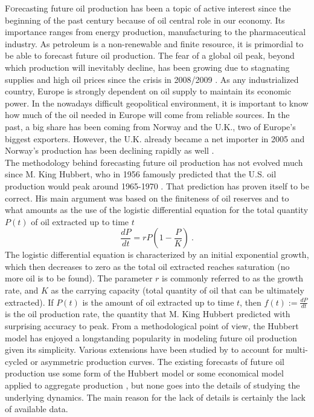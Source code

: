 \documentclass[review]{elsarticle}
\begin{document}
\lettrine[nindent=0em,lines=3] Forecasting future oil production
has been a topic of active interest since the beginning of the past
century because of oil central role in our economy. Its importance
ranges from energy production, manufacturing to the pharmaceutical
industry. As petroleum is a non-renewable and finite resource, it
is primordial to be able to forecast future oil production. The fear
of a global oil peak, beyond which production will inevitably decline,
has been growing due to stagnating supplies and high oil prices since
the crisis in 2008/2009 \citep{Murray2013}. As any industrialized
country, Europe is strongly dependent on oil supply to maintain its
economic power. In the nowadays difficult geopolitical environment,
it is important to know how much of the oil needed in Europe will
come from reliable sources. In the past, a big share has been coming
from Norway and the U.K., two of Europe's biggest exporters. However,
the U.K. already became a net importer in 2005 and Norway\textquoteright{}s
production has been declining rapidly as well \citep{Hook2008}.\\
 The methodology behind forecasting future oil production has not
evolved much since M. King Hubbert, who in 1956 famously predicted
that the U.S. oil production would peak around 1965-1970 \citep{Hubbert1956}.
That prediction has proven itself to be correct. His main argument
was based on the finiteness of oil reserves and to what amounts
as the use of the logistic differential equation for the total
quantity $P(t)$ of oil extracted up to time $t$
\begin{equation}
\frac{dP}{dt}=rP\left(1-\frac{P}{K}\right)~.
\label{logistic}
\end{equation}
The logistic differential equation
is characterized by an initial exponential growth, which then decreases
to zero as the total oil extracted reaches saturation (no more oil
is to be found). The parameter $r$ is commonly referred to as the
growth rate, and $K$ as the carrying capacity (total quantity of
oil that can be ultimately extracted). If $P(t)$ is the amount of oil extracted up to
time $t$, then $f(t) := \frac{dP}{dt}$ is the oil production rate, the quantity
that M. King Hubbert predicted with surprising accuracy to peak. From
a methodological point of view, the Hubbert model has enjoyed a longstanding
popularity in modeling future oil production given its simplicity.
Various extensions have been studied by \citet{Brandt2007}
to account for multi-cycled or asymmetric production curves.
The existing forecasts of future oil production use some form of the
Hubbert model \citep{Brecha2012,Laherrere2002,Lynch2002}
or some economical model applied to aggregate production \citep{Greiner2011},
but none goes into the details of studying the underlying dynamics.
The main reason for the lack of details is certainly the lack of available
data. 
\end{document}
